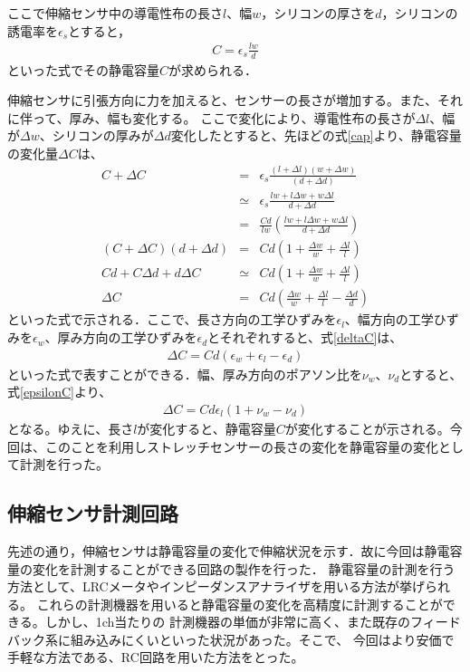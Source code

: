 \newpage

ここで伸縮センサ中の導電性布の長さ$l$、幅$w$，シリコンの厚さを$d$，シリコンの誘電率を$\epsilon{}_s$とすると，
\begin{eqnarray}
    C=\epsilon{}_s\frac{lw}{d}
    \label{cap}
\end{eqnarray}
といった式でその静電容量$C$が求められる．

伸縮センサに引張方向に力を加えると、センサーの長さが増加する。また、それに伴って、厚み、幅も変化する。
ここで変化により、導電性布の長さが$\Delta{l}$、幅が$\Delta{w}$、シリコンの厚みが$\Delta{d}$変化したとすると、先ほどの式\ref{cap}より、静電容量の変化量$\Delta{C}$は、
\begin{eqnarray}
    C+\Delta{C} &=& \epsilon{}_s\frac{(l+\Delta{l})(w+\Delta{w})}{(d+\Delta{}d)}\\
    & \simeq & \epsilon{}_s\frac{lw+l\Delta{w}+w\Delta{l}}{d+\Delta{d}}\\
    &=&\frac{Cd}{lw}\left(\frac{lw+l\Delta{w}+w\Delta{l}}{d+\Delta{d}}\right)\\
    (C+\Delta{C})(d+\Delta{d})&=&Cd\left(1+\frac{\Delta{w}}{w}+\frac{\Delta{l}}{l}\right)\\
    Cd+C\Delta{d}+d\Delta{C}& \simeq &Cd\left(1+\frac{\Delta{w}}{w}+\frac{\Delta{l}}{l}\right)\\
    \Delta{C}&=&Cd\left(\frac{\Delta{w}}{w}+\frac{\Delta{l}}{l}-\frac{\Delta{d}}{d}\right)
    \label{deltaC}
\end{eqnarray}
といった式で示される．ここで、長さ方向の工学ひずみを$\epsilon_l$、幅方向の工学ひずみを$\epsilon_w$、厚み方向の工学ひずみを$\epsilon_d$とそれぞれすると、式\ref{deltaC}は、
\begin{eqnarray}
    \Delta{C}=Cd(\epsilon_w+\epsilon_l-\epsilon_d)
    \label{epsilonC}
\end{eqnarray}
といった式で表すことができる．幅、厚み方向のポアソン比を$\nu_w$、$\nu_d$とすると、式\ref{epsilonC}より、
\begin{eqnarray}
    \Delta{C}=Cd\epsilon_l(1+\nu_w-\nu_d)
\end{eqnarray}
となる。ゆえに、長さ$l$が変化すると、静電容量$C$が変化することが示される。今回は、このことを利用しストレッチセンサーの長さの変化を静電容量の変化として計測を行った。

\subsection{伸縮センサ計測回路}
先述の通り，伸縮センサは静電容量の変化で伸縮状況を示す．故に今回は静電容量の変化を計測することができる回路の製作を行った．
静電容量の計測を行う方法として、LRCメータやインピーダンスアナライザを用いる方法が挙げられる。
これらの計測機器を用いると静電容量の変化を高精度に計測することができる。しかし、1ch当たりの
計測機器の単価が非常に高く、また既存のフィードバック系に組み込みにくいといった状況があった。そこで、
今回はより安価で手軽な方法である、RC回路を用いた方法をとった。


